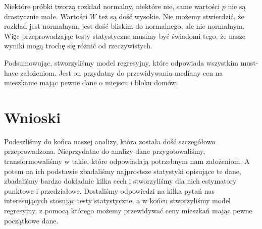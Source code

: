 \documentclass{article}
\begin{document}
\begin{itemize}
\begin{Schunk}
\end{Schunk}

\noindent
\quad Niektóre próbki tworzą rozk\l ad normalny, niektóre nie, same wartości $p$ nie są drastycznie ma\l e. Wartości $W$ też są doś\'c wysokie. Nie możemy stwierdzi\'c, że rozk\l ad jest normalnym, jest doś\'c bliskim do normalnego, ale nie normalnym. Wi\c ec przeprowadzając testy statystyczne musimy by\'c świadomi tego, że nasze wyniki mogą troch\c e si\c e różni\'c od rzeczywistych.
  
\end{itemize}

\noindent
\quad Podsumowując, stworzyliśmy model regresyjny, które odpowiada wszystkim must-have za\l ożeniom. Jest on przydatny do przewidywania mediany cen na mieszkanie mając pewne dane o miejscu i bloku domów.

\section{Wnioski}
\quad Podeszliśmy do końca naszej analizy, która zosta\l a doś\'c szczegó\l owo przeprowadzona. Nieprzydatne do analizy dane przygotowaliśmy, transformowaliśmy w takie, które odpowiadają potrzebnym nam za\l ożeniom. A potem na ich podstawie zbadaliśmy najprostsze statystyki opisujące te dane, zbadaliśmy bardzo dok\l adnie kilka cech i stworzyliśmy dla nich estymatory punktowe i przedzia\l owe. Dostaliśmy odpowiedzi na kilka pytań nas interesujących stosując testy statystyczne, a w końcu stworzyliśmy model regresyjny, z pomocą którego możemy przewidywa\'c ceny mieszkań mając pewne początkowe dane.
\end{document}
